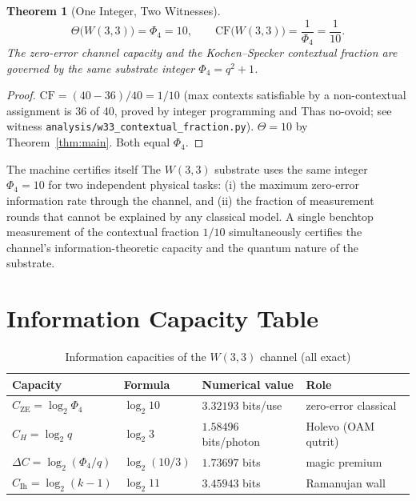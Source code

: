\documentclass[11pt]{article}
\newtheorem{theorem}{Theorem}[section]
\begin{document}
\begin{theorem}[One Integer, Two Witnesses]\label{thm:context}
\[
  \Theta\bigl(W(3,3)\bigr) = \Phi_4 = 10, \qquad
  \mathrm{CF}\bigl(W(3,3)\bigr) = \frac{1}{\Phi_4} = \frac{1}{10}.
\]
The zero-error channel capacity and the Kochen--Specker contextual fraction
are governed by the same substrate integer $\Phi_4 = q^2+1$.
\end{theorem}

\begin{proof}
$\mathrm{CF} = (40-36)/40 = 1/10$ (max contexts satisfiable by a non-contextual
assignment is 36 of 40, proved by integer programming and Thas no-ovoid;
see witness \texttt{analysis/w33\_contextual\_fraction.py}).
$\Theta = 10$ by Theorem~\ref{thm:main}. Both equal $\Phi_4$.
\end{proof}

\begin{keybox}{The machine certifies itself}
The $W(3,3)$ substrate uses the same integer $\Phi_4 = 10$ for two independent
physical tasks: (i) the maximum zero-error information rate through the channel,
and (ii) the fraction of measurement rounds that cannot be explained by any classical
model. A single benchtop measurement of the contextual fraction $1/10$ simultaneously
certifies the channel's information-theoretic capacity and the quantum nature of
the substrate.
\end{keybox}

\section{Information Capacity Table}

\begin{table}[h]
\centering
\caption{Information capacities of the $W(3,3)$ channel (all exact)}
\begin{tabular}{llll}
\toprule
Capacity & Formula & Numerical value & Role \\
\midrule
$C_{\mathrm{ZE}} = \log_2\Phi_4$ & $\log_2 10$ & $3.32193$ bits/use & zero-error classical \\
$C_H = \log_2 q$ & $\log_2 3$ & $1.58496$ bits/photon & Holevo (OAM qutrit) \\
$\Delta C = \log_2(\Phi_4/q)$ & $\log_2(10/3)$ & $1.73697$ bits & magic premium \\
$C_{\mathrm{Ih}} = \log_2(k{-}1)$ & $\log_2 11$ & $3.45943$ bits & Ramanujan wall \\
\bottomrule
\end{tabular}
\end{table}
\end{document}
